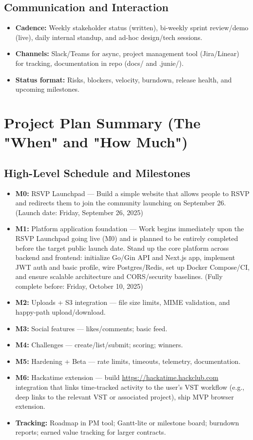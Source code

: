 \documentclass[12pt,a4paper]{article}
\begin{document}
\subsection{Communication and Interaction}
\begin{itemize}
\item \textbf{Cadence:} Weekly stakeholder status (written), bi-weekly sprint review/demo (live), daily internal standup, and ad-hoc design/tech sessions.
\item \textbf{Channels:} Slack/Teams for async, project management tool (Jira/Linear) for tracking, documentation in repo (docs/ and .junie/).
\item \textbf{Status format:} Risks, blockers, velocity, burndown, release health, and upcoming milestones.
\end{itemize}

\section{Project Plan Summary (The "When" and "How Much")}

\subsection{High-Level Schedule and Milestones}
\begin{itemize}
\item \textbf{M0:} RSVP Launchpad --- Build a simple website that allows people to RSVP and redirects them to join the community launching on September 26. (Launch date: Friday, September 26, 2025)
\item \textbf{M1:} Platform application foundation --- Work begins immediately upon the RSVP Launchpad going live (M0) and is planned to be entirely completed before the target public launch date. Stand up the core platform across backend and frontend: initialize Go/Gin API and Next.js app, implement JWT auth and basic profile, wire Postgres/Redis, set up Docker Compose/CI, and ensure scalable architecture and CORS/security baselines. (Fully complete before: Friday, October 10, 2025)
\item \textbf{M2:} Uploads + S3 integration --- file size limits, MIME validation, and happy-path upload/download.
\item \textbf{M3:} Social features --- likes/comments; basic feed.
\item \textbf{M4:} Challenges --- create/list/submit; scoring; winners.
\item \textbf{M5:} Hardening + Beta --- rate limits, timeouts, telemetry, documentation.
\item \textbf{M6:} Hackatime extension --- build \url{https://hackatime.hackclub.com} integration that links time-tracked activity to the user's VST workflow (e.g., deep links to the relevant VST or associated project), ship MVP browser extension.
\item \textbf{Tracking:} Roadmap in PM tool; Gantt-lite or milestone board; burndown reports; earned value tracking for larger contracts.
\end{itemize}
\end{document}
